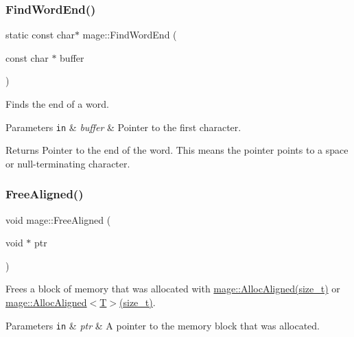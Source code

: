 \hypertarget{namespacemage_a81ebde51f9da00dd6fad364a2c5017cb}{}\label{namespacemage_a81ebde51f9da00dd6fad364a2c5017cb} 
\subsubsection{\texorpdfstring{Find\+Word\+End()}{FindWordEnd()}}
{\footnotesize\ttfamily static const char$\ast$ mage\+::\+Find\+Word\+End (\begin{DoxyParamCaption}\item[{const char $\ast$}]{buffer }\end{DoxyParamCaption})\hspace{0.3cm}{\ttfamily [static]}}

Finds the end of a word.


\begin{DoxyParams}[1]{Parameters}
\mbox{\tt in}  & {\em buffer} & Pointer to the first character. \\
\hline
\end{DoxyParams}
\begin{DoxyReturn}{Returns}
Pointer to the end of the word. This means the pointer points to a space or null-\/terminating character. 
\end{DoxyReturn}
\hypertarget{namespacemage_a401c54df21447c491c527735647b5f80}{}\label{namespacemage_a401c54df21447c491c527735647b5f80} 
\subsubsection{\texorpdfstring{Free\+Aligned()}{FreeAligned()}}
{\footnotesize\ttfamily void mage\+::\+Free\+Aligned (\begin{DoxyParamCaption}\item[{void $\ast$}]{ptr }\end{DoxyParamCaption})}

Frees a block of memory that was allocated with \hyperlink{namespacemage_a6c97f75df305a5e0a945e82a26e75c38}{mage\+::\+Alloc\+Aligned(size\+\_\+t)} or \hyperlink{namespacemage_a6c97f75df305a5e0a945e82a26e75c38}{mage\+::\+Alloc\+Aligned$<$\+T$>$(size\+\_\+t)}.


\begin{DoxyParams}[1]{Parameters}
\mbox{\tt in}  & {\em ptr} & A pointer to the memory block that was allocated. \\
\hline
\end{DoxyParams}
\hypertarget{namespacemage_afcc0891e1660f8457696cb30f4ee518a}{}\label{namespacemage_afcc0891e1660f8457696cb30f4ee518a} 
